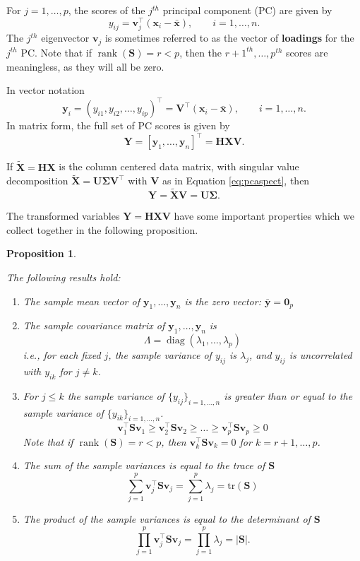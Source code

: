 \documentclass[
]{book}
\newtheorem{proposition}{Proposition}[chapter]
\theoremstyle{definition}
\theoremstyle{definition}
\theoremstyle{definition}
\theoremstyle{definition}
\theoremstyle{remark}
\begin{document}
For \(j=1, \ldots , p\), the scores of the \(j^{th}\) principal component (PC) are given by
\[
y_{ij}=\mathbf v_j^\top(\mathbf x_i - \bar{\mathbf x}), \qquad i=1, \ldots , n.
\]
The \(j^{th}\) eigenvector \(\mathbf v_j\) is sometimes referred to as the vector of \textbf{loadings} for the \(j^{th}\) PC. Note that if \(\operatorname{rank}(\mathbf S)=r<p\), then the \(r+1^{th}, \ldots, p^{th}\) scores are meaningless, as they will all be zero.

In vector notation
\[
\mathbf y_i=( y_{i1}, y_{i2}, \ldots , y_{ip})^\top = \mathbf V^\top (\mathbf x_i -\bar{\mathbf x}), \qquad i=1, \ldots ,n.
\]
In matrix form, the full set of PC scores is given by
\[
\mathbf Y= [\mathbf y_1 , \ldots , \mathbf y_n]^\top =\mathbf H\mathbf X\mathbf V.
\]

If \(\tilde{\mathbf X}=\mathbf H\mathbf X\) is the column centered data matrix, with singular value decomposition
\(\tilde{\mathbf X}=\mathbf U\boldsymbol{\Sigma}\mathbf V^\top\) with \(\mathbf V\) as in Equation \eqref{eq:pcaspect}, then
\[\mathbf Y= \tilde{\mathbf X}\mathbf V= \mathbf U\boldsymbol{\Sigma}.\]

The transformed variables \(\mathbf Y= \mathbf H\mathbf X\mathbf V\) have some important properties which we collect together in the following proposition.

\begin{proposition}
\protect\hypertarget{prp:pca2}{}\label{prp:pca2}

The following results hold:

\begin{enumerate}
\def\labelenumi{\arabic{enumi}.}
\item
  The sample mean vector of \(\mathbf y_1, \ldots , \mathbf y_n\) is the zero vector: \(\bar{\mathbf y}={\mathbf 0}_p\)
\item
  The sample covariance matrix of \(\mathbf y_1, \ldots, \mathbf y_n\) is
  \[\Lambda = \operatorname{diag}(\lambda_1, \ldots, \lambda_p)\]
  i.e., for each fixed \(j\), the sample variance of \(y_{ij}\) is \(\lambda_j\), and \(y_{ij}\) is uncorrelated with \(y_{ik}\) for \(j\not = k\).
\item
  For \(j\leq k\) the sample variance of \(\{y_{ij}\}_{i=1, \ldots , n}\) is greater than or equal to the sample variance of \(\{y_{ik}\}_{i=1, \ldots , n}\).
  \[\mathbf v_1^\top \mathbf S\mathbf v_1 \geq \mathbf v_2^\top \mathbf S\mathbf v_2 \geq \ldots \geq \mathbf v_p^\top \mathbf S\mathbf v_p\geq 0\]
  Note that if \(\operatorname{rank}(\mathbf S)=r<p\), then \(\mathbf v_k^\top \mathbf S\mathbf v_k = 0\) for \(k=r+1, \ldots, p\).
\item
  The sum of the sample variances is equal to the trace of \(\mathbf S\)
  \[\sum_{j=1}^p \mathbf v_j^\top \mathbf S\mathbf v_j = \sum_{j=1}^p \lambda_j = \text{tr}(\mathbf S)\]
\item
  The product of the sample variances is equal to the determinant of \(\mathbf S\)
  \[\prod_{j=1}^p \mathbf v_j^\top \mathbf S\mathbf v_j = \prod_{j=1}^p \lambda_j = |\mathbf S|.\]
\end{enumerate}

\end{proposition}
\end{document}
